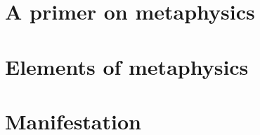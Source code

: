 \documentclass[a4paper,12pt,twoside]{book}
\begin{document}
\chapter{A primer on metaphysics}










\chapter{Elements of metaphysics}


















\chapter{Manifestation}



\end{document}
